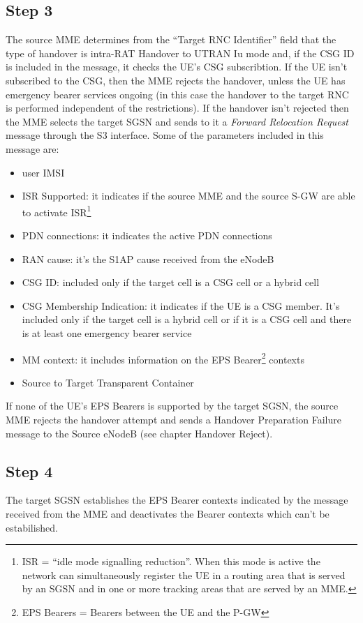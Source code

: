 \subsection*{Step 3}
The source MME determines from the ``Target RNC Identifier'' field that
the type of handover is intra-RAT Handover to UTRAN Iu mode and, if the CSG ID
is included in the message, it checks the UE's CSG subscribtion. If the UE isn't
subscribed to the CSG, then the MME rejects the handover, unless the UE has
emergency bearer services ongoing (in this case the handover to the target RNC is
performed independent of the restrictions).	If the handover isn't rejected then
the MME selects the target SGSN and sends to it	a \emph{Forward Relocation Request}
message through the S3 interface. Some of the parameters included in this message are:
\begin{itemize}
	\item user IMSI
	\item ISR Supported: it indicates if the source MME and the source S-GW are
	able to activate ISR\footnote{ISR = ``idle mode signalling reduction''. When
	this mode is active the network can simultaneously register the UE in a
	routing area that is served by an SGSN and in one or more tracking areas
	that are served by an MME.}
	\item PDN connections: it indicates the active PDN connections
	\item RAN cause: it's the S1AP cause received from the eNodeB
	\item CSG ID: included only if the target cell is a CSG cell or a hybrid cell
	\item CSG Membership Indication: it indicates if the UE is a CSG member. It's
	included only if the target cell is a hybrid cell or if it is a CSG cell and
	there is at least one emergency bearer service
	\item MM context: it includes information on the EPS Bearer\footnote{EPS Bearers
	= Bearers between the UE and the P-GW} contexts
	\item Source to Target Transparent Container
\end{itemize}
 If none of the UE's EPS Bearers is supported by the target SGSN, the source MME
 rejects the handover attempt and sends a Handover Preparation Failure message to the
 Source eNodeB (see chapter Handover Reject).


\subsection*{Step 4}
The target SGSN establishes the EPS Bearer contexts indicated by the message
received from the MME and deactivates the Bearer contexts which can't be
estabilished.

